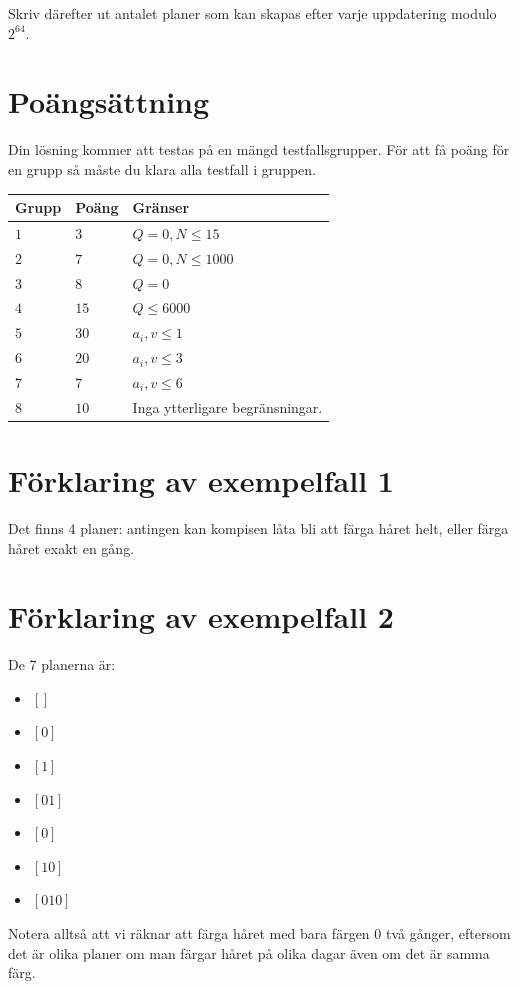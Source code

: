 Skriv därefter ut antalet planer som kan skapas efter varje uppdatering modulo $2^{64}$.

\section*{Poängsättning}
Din lösning kommer att testas på en mängd testfallsgrupper.
För att få poäng för en grupp så måste du klara alla testfall i gruppen.

\noindent
\begin{tabular}{| l | l | p{12cm} |}
  \hline
  \textbf{Grupp} & \textbf{Poäng} & \textbf{Gränser} \\ \hline
  $1$    & $3$        & $Q=0, N \leq 15$ \\ \hline
  $2$    & $7$        & $Q=0, N \leq 1000$ \\ \hline
  $3$    & $8$        & $Q=0$ \\ \hline
  $4$    & $15$       & $Q \leq 6000$ \\ \hline
  $5$    & $30$       & $a_i, v \leq 1$ \\ \hline
  $6$    & $20$       & $a_i, v \leq 3$ \\ \hline
  $7$    & $7$        & $a_i, v \leq 6$ \\ \hline
  $8$    & $10$       & Inga ytterligare begränsningar. \\ \hline
\end{tabular}


\section*{Förklaring av exempelfall 1}
Det finns 4 planer: antingen kan kompisen låta bli att färga håret helt, eller färga håret exakt en gång.

\section*{Förklaring av exempelfall 2}
De 7 planerna är:
\begin{itemize}
  \item $[]$
  \item $[0]$
  \item $[1]$
  \item $[0 1]$
  \item $[0]$
  \item $[1 0]$
  \item $[0 1 0]$
\end{itemize}
Notera alltså att vi räknar att färga håret med bara färgen $0$ två gånger, eftersom det är olika planer om man färgar håret på olika dagar även om det är samma färg.
